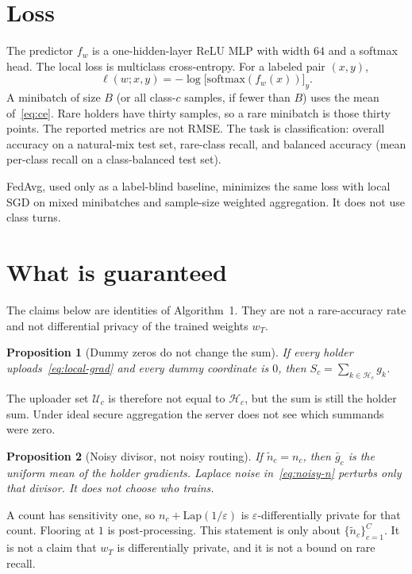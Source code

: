 \documentclass[11pt,a4paper]{article}
\theoremstyle{plain}
\newtheorem{proposition}{Proposition}
\begin{document}
\section{Loss}

The predictor $f_w$ is a one-hidden-layer ReLU MLP with width $64$ and a softmax head. The local loss is multiclass cross-entropy. For a labeled pair $(x,y)$,
\begin{equation}
\ell(w;x,y) = -\log \bigl[\mathrm{softmax}(f_w(x))\bigr]_{y}.
\label{eq:ce}
\end{equation}
A minibatch of size $B$ (or all class-$c$ samples, if fewer than $B$) uses the mean of~\eqref{eq:ce}. Rare holders have thirty samples, so a rare minibatch is those thirty points. The reported metrics are not RMSE. The task is classification: overall accuracy on a natural-mix test set, rare-class recall, and balanced accuracy (mean per-class recall on a class-balanced test set).

FedAvg, used only as a label-blind baseline, minimizes the same loss with local SGD on mixed minibatches and sample-size weighted aggregation. It does not use class turns.

\section{What is guaranteed}

The claims below are identities of Algorithm~1. They are not a rare-accuracy rate and not differential privacy of the trained weights $w_T$.

\begin{proposition}[Dummy zeros do not change the sum]
\label{prop:dummy}
If every holder uploads~\eqref{eq:local-grad} and every dummy coordinate is $0$, then
$S_c = \sum_{k\in\mathcal{H}_c} g_k$.
\end{proposition}

\noindent
The uploader set $\mathcal{U}_c$ is therefore not equal to $\mathcal{H}_c$, but the sum is still the holder sum. Under ideal secure aggregation the server does not see which summands were zero.

\begin{proposition}[Noisy divisor, not noisy routing]
\label{prop:divisor}
If $\tilde n_c = n_c$, then $\bar g_c$ is the uniform mean of the holder gradients. Laplace noise in~\eqref{eq:noisy-n} perturbs only that divisor. It does not choose who trains.
\end{proposition}

A count has sensitivity one, so $n_c+\mathrm{Lap}(1/\varepsilon)$ is $\varepsilon$-differentially private for that count. Flooring at $1$ is post-processing. This statement is only about $\{\tilde n_c\}_{c=1}^{C}$. It is not a claim that $w_T$ is differentially private, and it is not a bound on rare recall.
\end{document}
